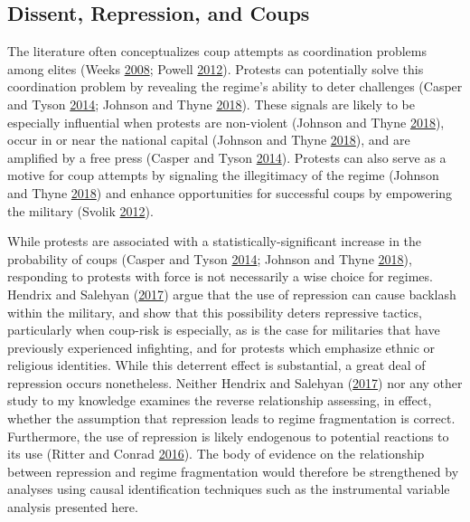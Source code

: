 \documentclass[12pt,]{article}
\theoremstyle{definition}
\theoremstyle{definition}
\theoremstyle{definition}
\theoremstyle{remark}
\begin{document}
\hypertarget{dissent-repression-and-coups}{%
\subsection{Dissent, Repression, and
Coups}\label{dissent-repression-and-coups}}

The literature often conceptualizes coup attempts as coordination
problems among elites (Weeks \protect\hyperlink{ref-Weeks2008}{2008};
Powell \protect\hyperlink{ref-Powell2012a}{2012}). Protests can
potentially solve this coordination problem by revealing the regime's
ability to deter challenges (Casper and Tyson
\protect\hyperlink{ref-Casper2014}{2014}; Johnson and Thyne
\protect\hyperlink{ref-Johnson2018}{2018}). These signals are likely to
be especially influential when protests are non-violent (Johnson and
Thyne \protect\hyperlink{ref-Johnson2018}{2018}), occur in or near the
national capital (Johnson and Thyne
\protect\hyperlink{ref-Johnson2018}{2018}), and are amplified by a free
press (Casper and Tyson \protect\hyperlink{ref-Casper2014}{2014}).
Protests can also serve as a motive for coup attempts by signaling the
illegitimacy of the regime (Johnson and Thyne
\protect\hyperlink{ref-Johnson2018}{2018}) and enhance opportunities for
successful coups by empowering the military (Svolik
\protect\hyperlink{ref-Svolik2012e}{2012}).

While protests are associated with a statistically-significant increase
in the probability of coups (Casper and Tyson
\protect\hyperlink{ref-Casper2014}{2014}; Johnson and Thyne
\protect\hyperlink{ref-Johnson2018}{2018}), responding to protests with
force is not necessarily a wise choice for regimes. Hendrix and Salehyan
(\protect\hyperlink{ref-Hendrix2017}{2017}) argue that the use of
repression can cause backlash within the military, and show that this
possibility deters repressive tactics, particularly when coup-risk is
especially, as is the case for militaries that have previously
experienced infighting, and for protests which emphasize ethnic or
religious identities. While this deterrent effect is substantial, a
great deal of repression occurs nonetheless. Neither Hendrix and
Salehyan (\protect\hyperlink{ref-Hendrix2017}{2017}) nor any other study
to my knowledge examines the reverse relationship assessing, in effect,
whether the assumption that repression leads to regime fragmentation is
correct. Furthermore, the use of repression is likely endogenous to
potential reactions to its use (Ritter and Conrad
\protect\hyperlink{ref-Ritter2016}{2016}). The body of evidence on the
relationship between repression and regime fragmentation would therefore
be strengthened by analyses using causal identification techniques such
as the instrumental variable analysis presented here.
\end{document}
